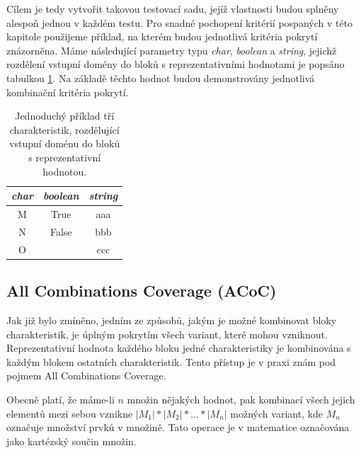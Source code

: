 Cílem je tedy vytvořit takovou testovací sadu, jejíž vlastnosti budou splněny alespoň jednou v každém testu. Pro snadné pochopení kritérií pospaných v této kapitole použijeme příklad, na kterém budou jednotlivá kritéria pokrytí znázorněna. Máme následující parametry typu \textit{char}, \textit{boolean} a \textit{string}, jejichž rozdělení vstupní domény do bloků s reprezentativními hodnotami je popsáno tabulkou \ref{table_kriteriaExample}. Na základě těchto hodnot budou demonstrovány jednotlivá kombinační kritéria pokrytí. 


\begin{table}[h!]
\centering
\begin{tabular}{ |c|c|c| } 
 \hline
\textit{char} & \textit{boolean} & \textit{string} \\ 
 \hline
 M & True & aaa \\
 N & False & bbb \\
 O &  & ccc \\ 
 \hline
\end{tabular}
\caption{Jednoduchý příklad tří charakteristik, rozdělující vstupní doménu do bloků s reprezentativní hodnotou.}
\label{table_kriteriaExample}
\end{table}




\subsection*{All Combinations Coverage (ACoC)}
\label{subsec_acoc}

Jak již bylo zmíněno, jedním ze způsobů, jakým je možné kombinovat bloky charakteristik, je úplným pokrytím všech variant, které mohou vzniknout. Reprezentativní hodnota každého bloku jedné charakteristiky je kombinována s každým blokem ostatních charakteristik. Tento přístup je v praxi znám pod pojmem All Combinations Coverage. 

Obecně platí, že máme-li $n$ množin nějakých hodnot, pak kombinací všech jejich elementů mezi sebou vznikne $|M_1|*|M_2|*...*|M_n|$ možných variant, kde $M_n$ označuje množství prvků v množině. Tato operace je v matematice označována jako kartézský součin množin.


